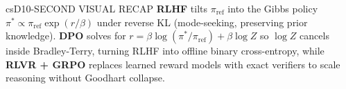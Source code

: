 \documentclass[../../../../master.tex]{subfiles}
\begin{document}
\begin{cscolumns}
\begin{cscard}{csD}{10-SECOND VISUAL RECAP}
  \sffamily\footnotesize
  \textbf{RLHF} tilts $\pi_{\mathrm{ref}}$ into the Gibbs policy $\pi^*\propto\pi_{\mathrm{ref}}\exp(r/\beta)$ under reverse KL (mode-seeking, preserving prior knowledge).
  \textbf{DPO} solves for $r=\beta\log(\pi^*/\pi_{\mathrm{ref}})+\beta\log Z$ so $\log Z$ cancels inside Bradley-Terry, turning RLHF into offline binary cross-entropy, while \textbf{RLVR + GRPO} replaces learned reward models with exact verifiers to scale reasoning without Goodhart collapse.
\end{cscard}
\end{cscolumns}

\csend
\end{document}
